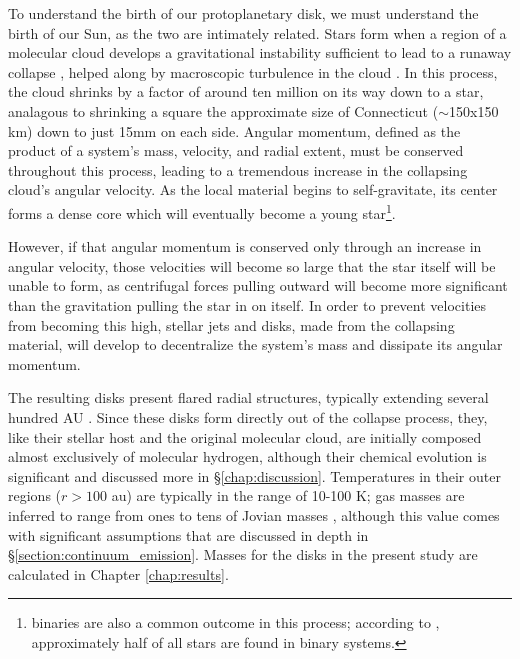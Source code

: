 To understand the birth of our protoplanetary disk, we must understand the birth of our Sun, as the two are intimately related. Stars form when a region of a molecular cloud develops a gravitational instability sufficient to lead to a runaway collapse \citep{Shu1987}, helped along by macroscopic turbulence in the cloud \citep{MckeeOstriker2007}. In this process, the cloud shrinks by a factor of around ten million on its way down to a star, analagous to shrinking a square the approximate size of Connecticut ($\sim$150x150 km) down to just 15mm on each side. Angular momentum, defined as the product of a system's mass, velocity, and radial extent, must be conserved throughout this process,  leading to a tremendous increase in the collapsing cloud's angular velocity. As the local material begins to self-gravitate, its center forms a dense core which will eventually become a young star\footnote{binaries are also a common outcome in this process; according to \citet{DucheneKraus2013}, approximately half of all stars are found in binary systems.}.

However, if that angular momentum is conserved only through an increase in angular velocity, those velocities will become so large that the star itself will be unable to form, as centrifugal forces pulling outward will become more significant than the gravitation pulling the star in on itself. In order to prevent velocities from becoming this high, stellar jets and disks, made from the collapsing material, will develop to decentralize the system's mass and dissipate its angular momentum.

The resulting disks present flared radial structures, typically extending several hundred AU \citep{VicenteAlves2005}. Since these disks form directly out of the collapse process, they, like their stellar host and the original molecular cloud, are initially composed almost exclusively of molecular hydrogen, although their chemical evolution is significant and discussed more in \S\ref{chap:discussion}. Temperatures in their outer regions ($r > 100$ au) are typically in the range of 10-100 K; gas masses are inferred to range from ones to tens of Jovian masses \citep{AndrewsWilliams2005}, although this value comes with significant assumptions that are discussed in depth in \S\ref{section:continuum_emission}. Masses for the disks in the present study are calculated in Chapter \ref{chap:results}.


